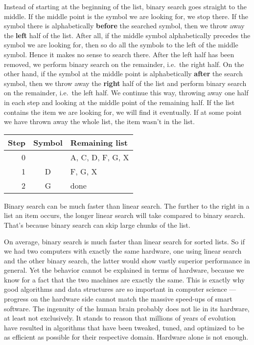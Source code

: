 \begin{examplebox}
    Instead of starting at the beginning of the list, binary search goes straight to the middle.
    If the middle point is the symbol we are looking for, we stop there.
    If the symbol there is alphabetically \textbf{before} the searched symbol, then we throw away the \textbf{left} half of the list.
    After all, if the middle symbol alphabetically precedes the symbol we are looking for, then so do all the symbols to the left of the middle symbol.
    Hence it makes no sense to search there.
    After the left half has been removed, we perform binary search on the remainder, i.e.~the right half.
    On the other hand, if the symbol at the middle point is alphabetically \textbf{after} the search symbol, then we throw away the \textbf{right} half of the list and perform binary search on the remainder, i.e.~the left half.
    We continue this way, throwing away one half in each step and looking at the middle point of the remaining half.
    If the list contains the item we are looking for, we will find it eventually.
    If at some point we have thrown away the whole list, the item wasn't in the list.
    \begin{center}
        \begin{tabular}{rcl}
            \toprule
            \textbf{Step} & \textbf{Symbol} & \textbf{Remaining list}\\
            \midrule
            0 &   & A, C, D, F, G, X\\
            1 & D & F, G, X\\
            2 & G & done\\
            \bottomrule
        \end{tabular}
    \end{center}
    
    Binary search can be much faster than linear search.
    The further to the right in a list an item occurs, the longer linear search will take compared to binary search.
    That's because binary search can skip large chunks of the list.%
    \label{ex:formal_search}
\end{examplebox}
%
On average, binary search is much faster than linear search for sorted lists.
So if we had two computers with exactly the same hardware, one using linear search and the other binary search, the latter would show vastly superior performance in general.
Yet the behavior cannot be explained in terms of hardware, because we know for a fact that the two machines are exactly the same.
This is exactly why good algorithms and data structures are so important in computer science --- progress on the hardware side cannot match the massive speed-ups of smart software.
The ingenuity of the human brain probably does not lie in its hardware, at least not exclusively.
It stands to reason that millions of years of evolution have resulted in algorithms that have been tweaked, tuned, and optimized to be as efficient as possible for their respective domain.
Hardware alone is not enough.

